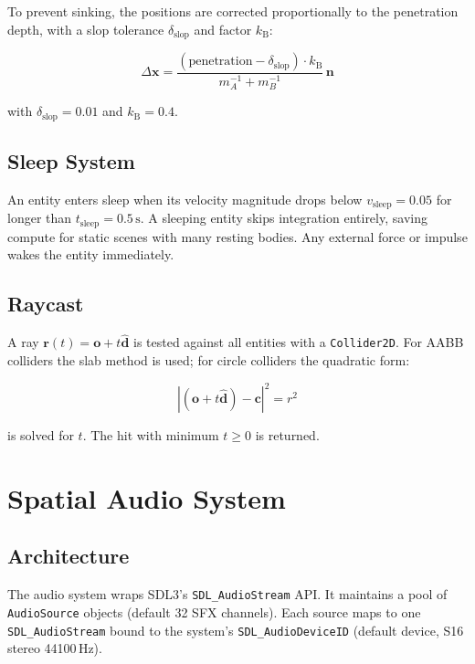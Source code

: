 \documentclass[12pt, a4paper]{report}
\theoremstyle{definition}
\theoremstyle{remark}
\begin{document}
To prevent sinking, the positions are corrected proportionally to the
penetration depth, with a slop tolerance $\delta_\text{slop}$ and
factor $k_\text{B}$:

\begin{equation}
\Delta\mathbf{x} = \frac{(\text{penetration} - \delta_\text{slop}) \cdot k_\text{B}}{m_A^{-1} + m_B^{-1}}\,\mathbf{n}
\end{equation}

with $\delta_\text{slop} = 0.01$ and $k_\text{B} = 0.4$.

\section{Sleep System}

An entity enters sleep when its velocity magnitude drops below
$v_\text{sleep} = 0.05$ for longer than $t_\text{sleep} = 0.5\,\text{s}$.
A sleeping entity skips integration entirely, saving compute for
static scenes with many resting bodies. Any external force or impulse
wakes the entity immediately.

\section{Raycast}

A ray $\mathbf{r}(t) = \mathbf{o} + t\hat{\mathbf{d}}$ is tested against
all entities with a \texttt{Collider2D}. For AABB colliders the
slab method is used; for circle colliders the quadratic form:

\begin{equation}
|(\mathbf{o} + t\hat{\mathbf{d}}) - \mathbf{c}|^2 = r^2
\end{equation}

is solved for $t$. The hit with minimum $t \geq 0$ is returned.

\chapter{Spatial Audio System}

\section{Architecture}

The audio system wraps SDL3's \texttt{SDL\_AudioStream} API. It maintains
a pool of \texttt{AudioSource} objects (default 32 SFX channels).
Each source maps to one \texttt{SDL\_AudioStream} bound to the system's
\texttt{SDL\_AudioDeviceID} (default device, S16 stereo 44100\,Hz).
\end{document}
